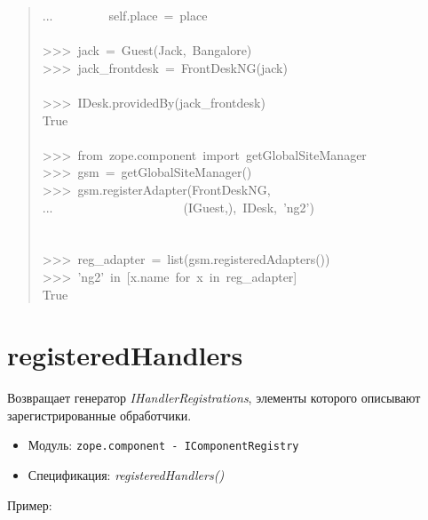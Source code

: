 \documentclass[a4paper,openany,twoside,final]{book}
\providecommand*{\DUroletitlereference}[1]{\textsl{#1}}
\begin{document}
\begin{quote}
{...~~~~~~~~~self.place~=~place\\
~\\
>{}>{}>~jack~=~Guest(\textquotedbl{}Jack\textquotedbl{},~\textquotedbl{}Bangalore\textquotedbl{})\\
>{}>{}>~jack\_frontdesk~=~FrontDeskNG(jack)\\
~\\
>{}>{}>~IDesk.providedBy(jack\_frontdesk)\\
True\\
~\\
>{}>{}>~from~zope.component~import~getGlobalSiteManager\\
>{}>{}>~gsm~=~getGlobalSiteManager()\\
>{}>{}>~gsm.registerAdapter(FrontDeskNG,\\
...~~~~~~~~~~~~~~~~~~~~~(IGuest,),~IDesk,~'ng2')\\
~\\
~\\
>{}>{}>~reg\_adapter~=~list(gsm.registeredAdapters())\\
>{}>{}>~'ng2'~in~{[}x.name~for~x~in~reg\_adapter{]}\\
True
}
\end{quote}


\section*{registeredHandlers%
  \label{registeredhandlers}%
}

Возвращает генератор \DUroletitlereference{IHandlerRegistrations}, элементы которого
описывают зарегистрированные обработчики.

\begin{itemize}

\item Модуль: \texttt{zope.component - IComponentRegistry}

\item Спецификация: \DUroletitlereference{registeredHandlers()}

\end{itemize}

Пример:
\end{document}
